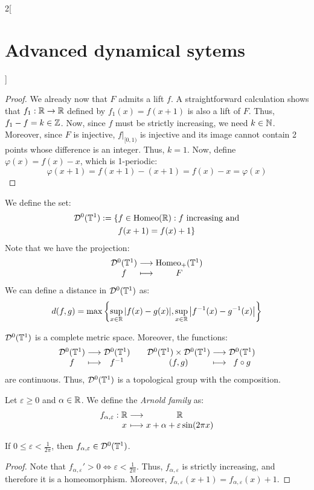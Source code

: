 \documentclass[../../../main_math.tex]{subfiles}
\begin{document}
\begin{multicols}{2}[\section{Advanced dynamical sytems}]
\begin{proof}
    We already now that $F$ admits a lift $f$. A straightforward calculation shows that $f_1:\mathbb{R}\to\mathbb{R}$ defined by $f_1(x)=f(x+1)$ is also a lift of $F$. Thus, $f_1-f=k\in \mathbb{Z}$. Now, since $f$ must be strictly increasing, we need $k\in \mathbb{N}$. Moreover, since $F$ is injective, $f|_{[0,1)}$ is injective and its image cannot contain 2 points whose difference is an integer. Thus, $k=1$. Now, define $\varphi(x)=f(x)-x$, which is 1-periodic:
    $$
      \varphi(x+1)=f(x+1)-(x+1)=f(x)-x=\varphi(x)
    $$
  \end{proof}
  \begin{definition}
    We define the set:
    \begin{multline*}
      \mathcal{D}^0(\mathbb{T}^1):=\{f\in \mathrm{Homeo}(\mathbb{R}):f\text{ increasing and}\\ f(x+1)=f(x)+1\}
    \end{multline*}
    Note that we have the projection:
    $$
      \function{}{\mathcal{D}^0(\TT^1)}{\Homeoplus(\TT^1)}{f}{F}
    $$
    We can define a distance in $\mathcal{D}^0(\mathbb{T}^1)$ as:
    $$
      d(f,g)=\max\left\{ \sup_{x\in\mathbb{R}}\abs{f(x)-g(x)},\sup_{x\in\mathbb{R}}\abs{f^{-1}(x)-g^{-1}(x)}\right\}
    $$
  \end{definition}
  \begin{lemma}
    $\mathcal{D}^0(\mathbb{T}^1)$ is a complete metric space. Moreover, the functions:
    $$
      \function{}{\mathcal{D}^0(\TT^1)}{\mathcal{D}^0(\TT^1)}{f}{f^{-1}}\quad
      \function{}{\mathcal{D}^0(\TT^1)\times \mathcal{D}^0(\TT^1)}{\mathcal{D}^0(\TT^1)}{(f,g)}{f\circ g}
    $$
    are continuous.
    Thus, $\mathcal{D}^0(\mathbb{T}^1)$ is a topological group with the composition.
  \end{lemma}
  \begin{definition}
    Let $\varepsilon\geq 0$ and $\alpha\in\mathbb{R}$. We define the \emph{Arnold family} as:
    $$
      \function{f_{\alpha,\varepsilon}}{\RR}{\RR}{x}{x+\alpha+\varepsilon\sin(2\pi x)}
    $$
  \end{definition}
  \begin{lemma}
    If $0\leq \varepsilon<\frac{1}{2\pi}$, then $f_{\alpha,\varepsilon}\in \mathcal{D}^0(\mathbb{T}^1)$.
  \end{lemma}
  \begin{proof}
    Note that ${f_{\alpha,\varepsilon}}'>0\iff \varepsilon<\frac{1}{2\pi}$. Thus, $f_{\alpha,\varepsilon}$ is strictly increasing, and therefore it is a homeomorphism. Moreover, $f_{\alpha,\varepsilon}(x+1)=f_{\alpha,\varepsilon}(x)+1$.
  \end{proof}

\end{multicols}
\end{document}
